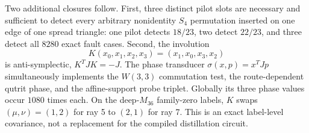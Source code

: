 Two additional closures follow.  First, three distinct pilot slots are necessary and sufficient to detect every arbitrary nonidentity $S_4$ permutation inserted on one edge of one spread triangle: one pilot detects $18/23$, two detect $22/23$, and three detect all $8280$ exact fault cases.  Second, the involution
\[
 K(x_0,x_1,x_2,x_3)=(x_1,x_0,x_3,x_2)
\]
is anti-symplectic, $K^TJK=-J$.  The phase transducer $\sigma(x,p)=x^TJp$ simultaneously implements the $W(3,3)$ commutation test, the route-dependent qutrit phase, and the affine-support probe triplet.  Globally its three phase values occur $1080$ times each.  On the deep-$M_{36}$ family-zero labels, $K$ swaps $(\mu,\nu)=(1,2)$ for ray 5 to $(2,1)$ for ray 7.  This is an exact label-level covariance, not a replacement for the compiled distillation circuit.
